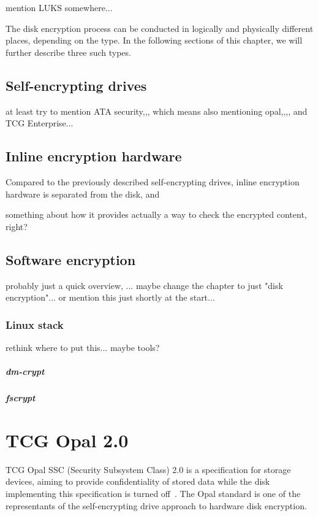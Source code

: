 \documentclass[
  digital, %
  oneside, %
  nolof,     %
  nolot,     %
]{fithesis4}
\begin{document}
mention LUKS somewhere...

The disk encryption process can be conducted in logically and physically different places, depending on the type. In the following sections of this chapter, we will further describe three such types.

\section{Self-encrypting drives}

at least try to mention ATA security,,, which means also mentioning opal,,,, and TCG Enterprise...

\section{Inline encryption hardware}

Compared to the previously described self-encrypting drives, inline encryption hardware is separated from the disk, and 

something about how it provides actually a way to check the encrypted content, right?

\section{Software encryption}

probably just a quick overview, ... maybe change the chapter to just "disk encryption"... or mention this just shortly at the start...

\subsection{Linux stack}

rethink where to put this... maybe tools?

\paragraph{dm-crypt}

\paragraph{fscrypt}

\chapter{TCG Opal 2.0}

TCG Opal SSC (Security Subsystem Class) 2.0 is a specification for storage devices, aiming to provide confidentiality of stored data while the disk implementing this specification is turned off~\cite{tcg-opal2}. The Opal standard is one of the representants of the self-encrypting drive approach to hardware disk encryption.
\end{document}
